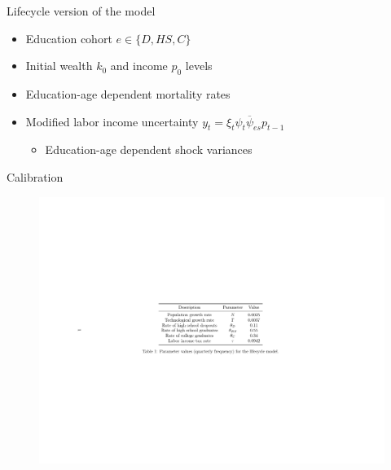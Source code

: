 \documentclass{beamer}
\begin{document}
 
\begin{frame}{Lifecycle version of the model}
\begin{itemize}
\item Education cohort $e \in \{D, HS, C\}$
\item Initial wealth $k_0$ and income $p_0$ levels 
\item Education-age dependent mortality rates 
\par \parencite{Brown2007}
\item Modified labor income uncertainty $y_t = \xi_t \psi_t \overline{\psi}_{es} p_{t-1}$ 
\par \parencite{Cagetti2003}
\begin{itemize}
\item Education-age dependent shock variances 
\par \parencite{Sabelhaus2010}
\end{itemize}
\end{itemize}
\end{frame}

\begin{frame}{Calibration}
  \vfill
   \begin{figure}
    \centering
    \includegraphics[width=.85\linewidth, scale=1.5]{Tables/calibrationLC.pdf}
  \end{figure}
  \vfill
\end{frame}
\end{document}
